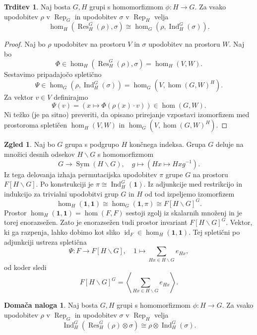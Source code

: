 \documentclass[11pt]{book}
\def\11{\mathbf{1}}
\DeclareMathOperator\Res{Res}
\DeclareMathOperator\Ind{Ind}
\DeclareMathOperator\Rep{Rep}
\DeclareMathOperator\Sym{Sym}
\DeclareMathOperator\id{id}
\theoremstyle{definition}
\theoremstyle{zgled}
\newtheorem*{zgled}{Zgled}
\theoremstyle{odprtproblem}
\theoremstyle{domacanaloga}
\newtheorem*{domacanaloga}{Domača naloga}
\newenvironment{dokaz}
    {\color{siva}\begin{proof}}
    {\end{proof}}
\theoremstyle{izrek}
\newtheorem*{trditev}{Trditev}
\begin{document}
\begin{trditev}
    Naj bosta $G,H$ grupi s homomorfizmom $\phi \colon H \to G$. Za vsako upodobitev $\rho$ v $\Rep_G$ in upodobitev $\sigma$ v $\Rep_H$ velja
    \[
        \textstyle \hom_H(\Res^G_H(\rho), \sigma) \cong 
        \hom_G(\rho, \Ind^G_H(\sigma)).
    \]
\end{trditev}
\begin{dokaz}
Naj bo $\rho$ upodobitev na prostoru $V$ in $\sigma$ upodobitev na prostoru $W$. Naj bo
\[
    \Phi \in \hom_H(\Res^G_H(\rho), \sigma) = \hom_H(V, W).
\]
Sestavimo pripadajočo spletično
\[
    \Psi \in \hom_G(\rho, \Ind^G_H(\sigma)) = \hom_G(V, \hom(G,W)^H).
    \]
Za vektor $v \in V$ definirajmo
\[
    \Psi(v) = \left( x \mapsto \Phi(\rho(x) \cdot v) \right) \in \hom(G,W).
\]
Ni težko (je pa sitno) preveriti, da opisano prirejanje vzpostavi izomorfizem med prostoroma spletičen $\hom_H(V,W)$ in $\hom_G(V,\hom(G,W)^H)$.
\end{dokaz}

\begin{zgled}
Naj bo $G$ grupa s podgrupo $H$ končnega indeksa. Grupa $G$ deluje na množici desnih odsekov $H \backslash G$ s homomorfizmom
\[
    G \to \Sym(H \backslash G), \quad
    g \mapsto \left( Hx \mapsto Hxg^{-1} \right).
\]
Iz tega delovanja izhaja permutacijska upodobitev $\pi$ grupe $G$ na prostoru $F[H \backslash G]$. Po konstrukciji je $\pi \cong \Ind^G_H(\11)$. Iz adjunkcije med restrikcijo in indukcijo za trivialni upodobitvi grup $G$ in $H$ od tod izpeljemo izomorfizem
\[
    \hom_H(\11, \11) \cong \hom_G(\11, \pi) \cong F[H \backslash G]^G.
\]
Prostor $\hom_H(\11, \11) = \hom(F,F)$ sestoji zgolj iz skalarnih množenj in je torej enorazsežen. Zato je enorazsežen tudi prostor invariant $F[H \backslash G]^G$. Vektor, ki ga razpenja, lahko dobimo kot sliko $\id_F \in \hom_H(\11, \11)$. Tej spletični po adjunkciji ustreza spletična
\[
    \Psi \colon F \to F[H \backslash G], \quad
    1 \mapsto \sum_{Hx \in H \backslash G} e_{Hx},
\] 
od koder sledi
\[
    F[H \backslash G]^G = \left\langle \sum_{Hx \in H \backslash G} e_{Hx} \right\rangle.
\]
\end{zgled}

\begin{domacanaloga}
    Naj bosta $G,H$ grupi s homomorfizmom $\phi \colon H \to G$. Za vsako upodobitev $\rho$ v $\Rep_G$ in upodobitev $\sigma$ v $\Rep_H$ velja
    \[
        \textstyle \Ind^G_H(\Res^G_H(\rho) \otimes \sigma) \cong
        \rho \otimes \Ind^G_H(\sigma).
    \]
\end{domacanaloga}
\end{document}
